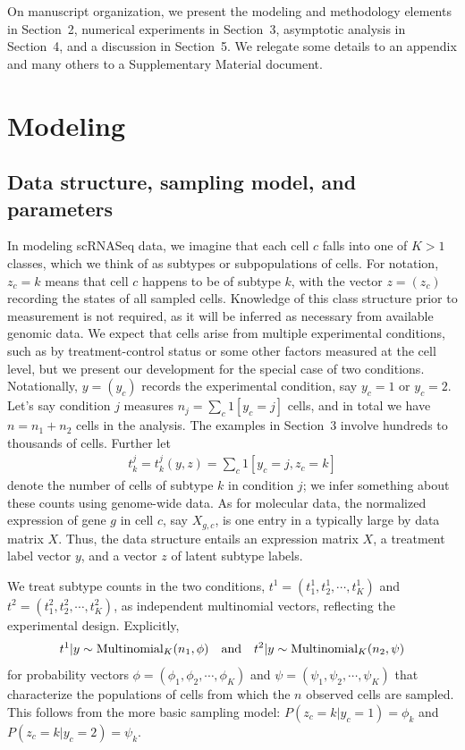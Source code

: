 \documentclass[aoas,preprint]{imsart}
\begin{document}
On manuscript organization, we present
the modeling and methodology elements in Section~2, numerical experiments in Section~3,  asymptotic analysis in Section~4, and a discussion
in Section~5.  We relegate some details to an appendix and many others to a Supplementary 
Material document.



\section{Modeling}
\subsection{Data structure, sampling model, and parameters}

In modeling scRNASeq data, we
imagine that each cell $c$ falls into one of $K>1$ classes, which we think of as
subtypes or subpopulations of cells. For notation, $z_c=k$ means that cell $c$ happens to be of subtype $k$, with the vector $z=(z_c)$ recording
the states of all sampled cells.  Knowledge of this class structure
 prior to measurement is not required, as it will be inferred as necessary from
 available genomic data.   We expect that cells arise from multiple
experimental conditions, such as by treatment-control status or some other factors
 measured at the cell level, but we present our development for the special
case of two conditions.  Notationally, $y=(y_c)$ records the experimental condition, say $y_c=1$ or $y_c=2$.
 Let's say condition $j$ measures $n_j=\sum_{c} 1[y_c=j]$ cells,  and
in total we have $n=n_1+n_2$ cells in the analysis.  The examples in Section~3 involve hundreds to thousands of cells.
Further let \begin{eqnarray}
\label{eq:counts}
t^j_k = t^j_k(y,z) = \sum_c 1[y_c=j, z_c=k] 
\end{eqnarray}
denote the number of cells of subtype $k$ in condition $j$;
we infer something about these counts using genome-wide data.  As for molecular data, the 
normalized expression of gene $g$ in cell $c$, say $X_{g,c}$, is one entry
in a typically large {} by {} data matrix $X$.  Thus, the data structure entails an expression matrix
$X$, a treatment label vector $y$, and a vector $z$ of latent subtype labels.


We treat subtype counts in the two conditions,  $t^1 = (t^1_1, t^1_2, \cdots, t^1_K )$ and 
$t^2 = (t^2_1, t^2_2, \cdots, t^2_K)$,  as independent multinomial
vectors, reflecting the experimental design.  Explicitly,
\begin{eqnarray}
\label{eq:mult}
t^1| y \sim \text{Multinomial}_K( n_1, \phi ) \quad {\mbox {\rm and}} \quad
t^2| y \sim \text{Multinomial}_K( n_2, \psi )
\end{eqnarray}
for probability vectors 
$\phi = (\phi_1, \phi_2, \cdots, \phi_K)$ and 
 $\psi = ( \psi_1, \psi_2, \cdots, \psi_K)$ that characterize the populations of
cells from which the $n$ observed cells are sampled.  This follows from the more basic 
sampling model:
$P(z_c=k|y_c=1) = \phi_k$ and $P(z_c=k| y_c =2 ) = \psi_k.$
\end{document}
